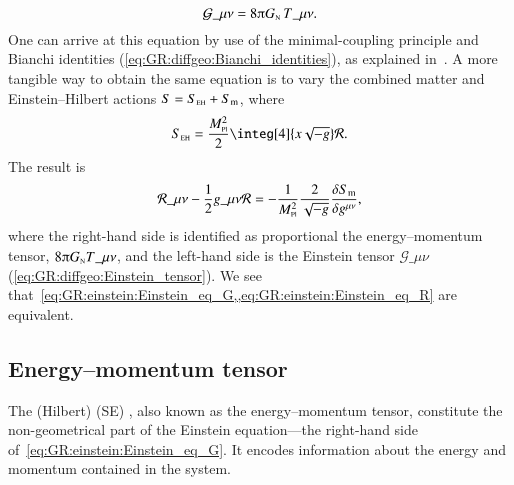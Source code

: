 \begin{equation}\label{eq:GR:einstein:Einstein_eq_G}
    \mathcal{G}\_{\mu\nu} = 8 \ppi G\nped{N} \, T\_{\mu\nu}.
\end{equation}
One can arrive at this equation by use of the minimal-coupling principle and Bianchi identities (\cref{eq:GR:diffgeo:Bianchi_identities}), as explained in~\citet[~4]{carrollSpacetimeGeometryIntroduction2019}. %
A more tangible way to obtain the same equation is to vary the combined matter and Einstein--Hilbert actions $S =S_{\text{\tiny{EH}}} + S_\mathrm{m}$, where~\citep{carrollSpacetimeGeometryIntroduction2019}
\begin{equation}
    S\nped{EH} =  \frac{M\nped{Pl}^2}{2} \integ[4]{x\sqrt{-g} } \mathcal{R}.
\end{equation}
The result is~\citep{carrollSpacetimeGeometryIntroduction2019}
\begin{equation}\label{eq:GR:einstein:Einstein_eq_R}
    \mathcal{R}\_{\mu\nu} - \frac{1}{2}g\_{\mu\nu} \mathcal{R}= - \frac{1}{M\nped{Pl}^2} \frac{2}{\sqrt{-g}}\Fdv{S\ped{m}}{g\^{\mu\nu}},
\end{equation}
where the right-hand side is identified as proportional the energy--momentum tensor, $8\piGN T\_{\mu\nu}$, and the left-hand side is the Einstein tensor $\mathcal{G}\_{\mu\nu}$ (\cref{eq:GR:diffgeo:Einstein_tensor}). We see that~\cref{eq:GR:einstein:Einstein_eq_G,,eq:GR:einstein:Einstein_eq_R} are equivalent. %


\subsection{Energy--momentum tensor}\label{sec:GR:einstein:SE_tensor}
    The (Hilbert)  (SE) , also known as the energy--momentum tensor, constitute the non-geometrical part of the Einstein equation---the right-hand side of~\cref{eq:GR:einstein:Einstein_eq_G}. It encodes information about the energy and momentum contained in the system.

